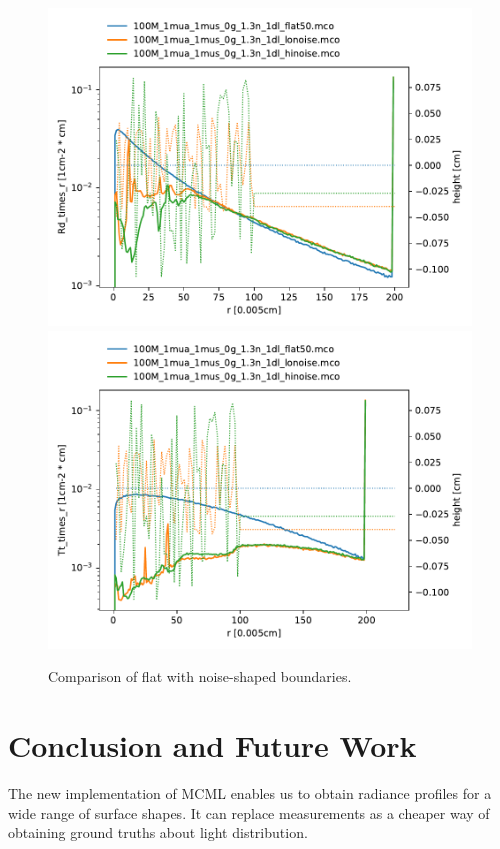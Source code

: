 \documentclass[]{article}
\begin{document}
\begin{figure}[ht!]
\includegraphics[width=\linewidth]{img/noise_R.pdf}
\includegraphics[width=\linewidth]{img/noise_T.pdf}
\caption{Comparison of flat with noise-shaped boundaries.}
\label{results:fig:noise}
\end{figure}

\section{Conclusion and Future Work}

The new implementation of MCML enables us to obtain radiance profiles for a wide range of surface shapes. It can replace measurements as a cheaper way of obtaining ground truths about light distribution.
\end{document}

